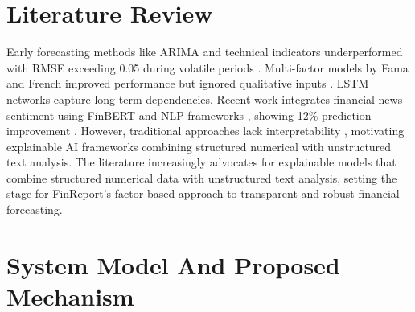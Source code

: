 \documentclass[3p,times,procedia]{elsarticle}
\begin{document}


\section{Literature Review}

Early forecasting methods like ARIMA \cite{Box1970} and technical indicators \cite{Wilder1978} underperformed with RMSE exceeding 0.05 during volatile periods \cite{Poon2003}. Multi-factor models by Fama and French \cite{FAMA1993} improved performance but ignored qualitative inputs \cite{Malkiel2003}. LSTM networks \cite{hochreiter1997lstm,Fischer2018} capture long-term dependencies. Recent work integrates financial news sentiment using FinBERT \cite{Araci2019} and NLP frameworks \cite{Loughran2011}, showing 12\% prediction improvement \cite{Ding2015}. However, traditional approaches lack interpretability \cite{Ribeiro2016}, motivating explainable AI frameworks combining structured numerical with unstructured text analysis.  The literature increasingly advocates for explainable models that combine structured numerical data with unstructured text analysis, setting the stage for FinReport’s factor-based approach to transparent and robust financial forecasting.

\section{System Model And Proposed Mechanism}
\end{document}
